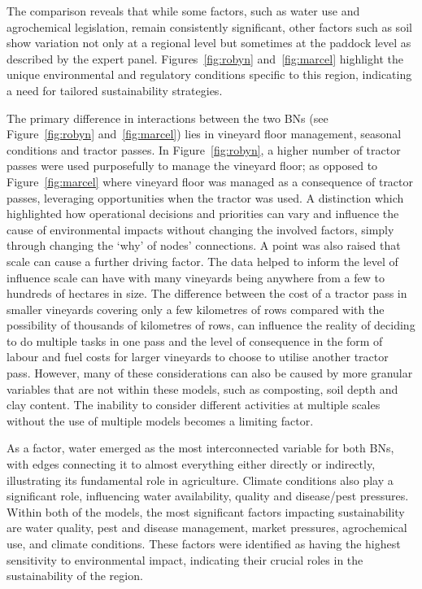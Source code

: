 \documentclass[fleqn,10pt]{wlscirep}
\begin{document}
The comparison reveals that while some factors, such as water use and agrochemical legislation, remain consistently significant, other factors such as soil show variation not only at a regional level but sometimes at the paddock level as described by the expert panel. Figures~\ref{fig:robyn} and~\ref{fig:marcel} highlight the unique environmental and regulatory conditions specific to this region, indicating a need for tailored sustainability strategies.

The primary difference in interactions between the two BNs (see Figure~\ref{fig:robyn} and~\ref{fig:marcel}) lies in vineyard floor management, seasonal conditions and tractor passes. In Figure~\ref{fig:robyn}, a higher number of tractor passes were used purposefully to manage the vineyard floor; as opposed to Figure~\ref{fig:marcel} where vineyard floor was managed as a consequence of tractor passes, leveraging opportunities when the tractor was used. A distinction which highlighted how operational decisions and priorities can vary and influence the cause of environmental impacts without changing the involved factors, simply through changing the `why' of nodes' connections. A point was also raised that scale can cause a further driving factor. The data helped to inform the level of influence scale can have with many vineyards being anywhere from a few to hundreds of hectares in size. The difference between the cost of a tractor pass in smaller vineyards covering only a few kilometres of rows compared with the possibility of thousands of kilometres of rows, can influence the reality of deciding to do multiple tasks in one pass and the level of consequence in the form of labour and fuel costs for larger vineyards to choose to utilise another tractor pass. However, many of these considerations can also be caused by more granular variables that are not within these models, such as composting, soil depth and clay content. The inability to consider different activities at multiple scales without the use of multiple models becomes a limiting factor.


As a factor, water emerged as the most interconnected variable for both BNs, with edges connecting it to almost everything either directly or indirectly, illustrating its fundamental role in agriculture. Climate conditions also play a significant role, influencing water availability, quality and disease/pest pressures. Within both of the models, the most significant factors impacting sustainability are water quality, pest and disease management, market pressures, agrochemical use, and climate conditions. These factors were identified as having the highest sensitivity to environmental impact, indicating their crucial roles in the sustainability of the region.
\end{document}
